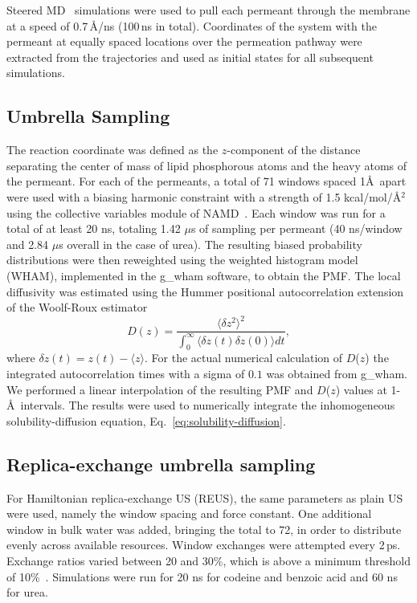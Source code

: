 Steered MD~\cite{Izrailev1997,Sotomayor2007} simulations were used to pull each permeant through the membrane at a speed of 0.7\,\AA/ns (100\,ns in total).  Coordinates of the system with the permeant at equally spaced locations over the permeation pathway were extracted from the trajectories and used as initial states for all subsequent simulations.

  \subsection*{Umbrella Sampling}

    \par The reaction coordinate was defined as the $z$-component of the distance separating the center of mass of lipid phosphorous atoms and the heavy atoms of the permeant. For each of the permeants, a total of 71 windows spaced 1\AA~apart were used with a biasing harmonic constraint with a strength of 1.5 kcal/mol/\AA$^2$ using the collective variables module of NAMD~\cite{Henin2010}.  Each window was run for a total of at least 20 ns, totaling 1.42 $\mu$s of sampling per permeant (40 ns/window and 2.84 $\mu$s overall in the case of urea). The resulting biased probability distributions were then reweighted using the weighted histogram model (WHAM)\cite{Kumar1992,Tan2012,Chodera2007}, implemented in the g\_wham software\cite{Hub2010}, to obtain the PMF. The local diffusivity was estimated using the Hummer positional autocorrelation extension of the Woolf-Roux estimator\cite{Hummer2005,Woolf1994}
    \begin{equation}
      D(z) = \frac{\langle\delta z^2\rangle^2}{\int_{0}^{\infty}\langle\delta z(t)\delta z(0)\rangle dt},
    \label{eq:hummer}
    \end{equation}
    where $\delta z(t) = z(t)-\langle z\rangle$. For the actual numerical calculation of $D$($z$) the integrated autocorrelation times with a sigma of $0.1$ was obtained from g\_wham. We performed a linear interpolation of the resulting PMF and $D$($z$) values at 1-\AA~intervals. The results were used to numerically integrate the inhomogeneous solubility-diffusion equation, Eq.~\ref{eq:solubility-diffusion}.

  \subsection*{Replica-exchange umbrella sampling}
    \par For Hamiltonian replica-exchange US (REUS), the same parameters as plain US were used, namely the window spacing and force constant. One additional window in bulk water was added, bringing the total to 72, in order to distribute evenly across available resources.  Window exchanges were attempted every 2\,ps. Exchange ratios varied between 20 and 30\%, which is above a minimum threshold of 10\%~\cite{Sugita1999}.  Simulations were run for 20 ns for codeine and benzoic acid and 60 ns for urea.

